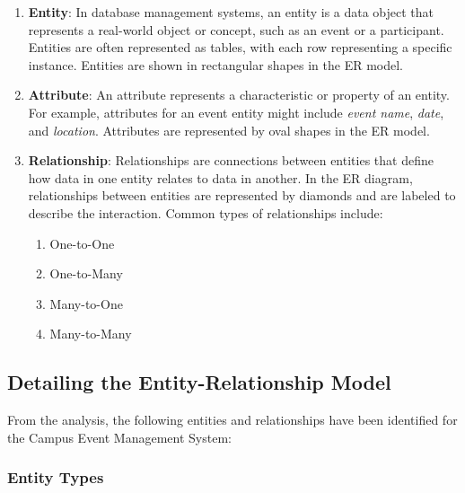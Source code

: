\begin{enumerate}
    \item \textbf{Entity}: In database management systems, an entity is a data object that represents a real-world object or concept, such as an event or a participant. Entities are often represented as tables, with each row representing a specific instance. Entities are shown in rectangular shapes in the ER model.

    \item \textbf{Attribute}: An attribute represents a characteristic or property of an entity. For example, attributes for an event entity might include \textit{event name}, \textit{date}, and \textit{location}. Attributes are represented by oval shapes in the ER model.

    \item \textbf{Relationship}: Relationships are connections between entities that define how data in one entity relates to data in another. In the ER diagram, relationships between entities are represented by diamonds and are labeled to describe the interaction. Common types of relationships include:
    \begin{enumerate}
        \item One-to-One
        \item One-to-Many
        \item Many-to-One
        \item Many-to-Many
    \end{enumerate}
\end{enumerate}

\subsection{Detailing the Entity-Relationship Model}

From the analysis, the following entities and relationships have been identified for the Campus Event Management System:

\subsubsection{Entity Types}

